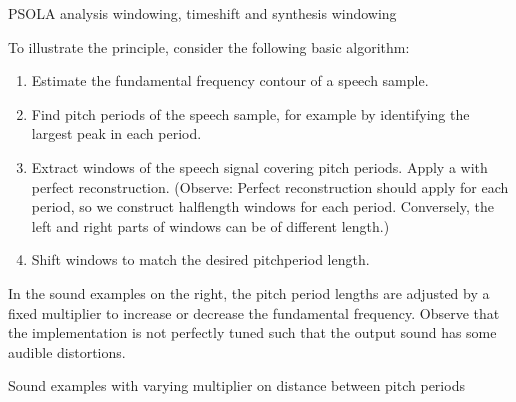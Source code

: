 \documentclass[letterpaper,10pt,english]{jupyterBook}
\begin{document}
\sphinxAtStartPar
PSOLA analysis windowing, time\sphinxhyphen{}shift and synthesis windowing

\sphinxAtStartPar
{}

\sphinxAtStartPar
To illustrate the principle, consider the following basic algorithm:
\begin{enumerate}
%
\item {} 
\sphinxAtStartPar
Estimate the fundamental frequency contour of a speech sample.

\item {} 
\sphinxAtStartPar
Find pitch periods of the speech sample, for example by identifying
the largest peak in each period.

\item {} 
\sphinxAtStartPar
Extract windows of the speech signal covering  pitch periods.
Apply a {\hyperref[\detokenize{Representations/Windowing::doc}]{}} with perfect reconstruction.
(Observe: Perfect reconstruction should apply for each period, so we
construct half\sphinxhyphen{}length windows for each period. Conversely, the left
and right parts of windows can be of different length.)

\item {} 
\sphinxAtStartPar
Shift windows to match the desired pitch\sphinxhyphen{}period length.

\end{enumerate}

\sphinxAtStartPar
In the sound examples on the right, the pitch period lengths are
adjusted by a fixed multiplier to increase or decrease the fundamental
frequency. Observe that the implementation is not perfectly tuned such
that the output sound has some audible distortions.

\sphinxAtStartPar
Sound examples with varying multiplier on distance between pitch periods
\end{document}
